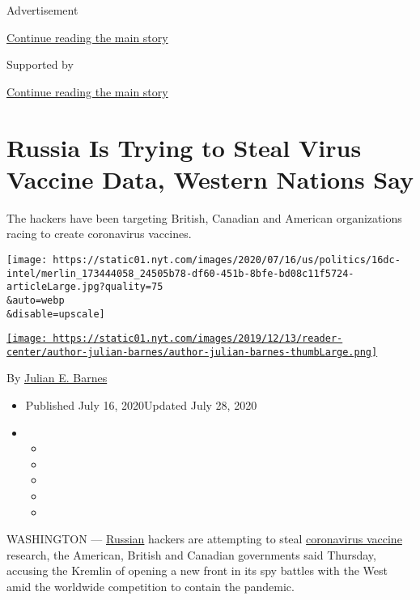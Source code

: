 Advertisement

\protect\hyperlink{after-top}{Continue reading the main story}

Supported by

\protect\hyperlink{after-sponsor}{Continue reading the main story}

\hypertarget{russia-is-trying-to-steal-virus-vaccine-data-western-nations-say}{%
\section{Russia Is Trying to Steal Virus Vaccine Data, Western Nations
Say}\label{russia-is-trying-to-steal-virus-vaccine-data-western-nations-say}}

The hackers have been targeting British, Canadian and American
organizations racing to create coronavirus vaccines.

\texttt{[image: https://static01.nyt.com/images/2020/07/16/us/politics/16dc-intel/merlin\_173444058\_24505b78-df60-451b-8bfe-bd08c11f5724-articleLarge.jpg?quality=75\\\&auto=webp\\\&disable=upscale]}

\href{https://www.nytimes.com/by/julian-e-barnes}{\texttt{[image: https://static01.nyt.com/images/2019/12/13/reader-center/author-julian-barnes/author-julian-barnes-thumbLarge.png]}}

By \href{https://www.nytimes.com/by/julian-e-barnes}{Julian E. Barnes}

\begin{itemize}
\item
  Published July 16, 2020Updated July 28, 2020
\item
  \begin{itemize}
  \item
  \item
  \item
  \item
  \item
  \end{itemize}
\end{itemize}

WASHINGTON ---
\href{https://www.nytimes.com/2020/07/28/us/politics/russia-disinformation-coronavirus.html}{Russian}
hackers are attempting to steal
\href{https://www.nytimes.com/2020/07/28/us/politics/russia-disinformation-coronavirus.html}{coronavirus
vaccine} research, the American, British and Canadian governments said
Thursday, accusing the Kremlin of opening a new front in its spy battles
with the West amid the worldwide competition to contain the pandemic.

